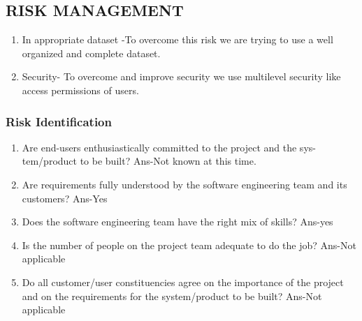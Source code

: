 \documentclass[12pt]{report}
\begin{document}
\subsection{RISK MANAGEMENT}
\justifying
\setlength{\parindent}{4em}
\setlength{\parskip}{0.5em}
\renewcommand{\baselinestretch}{1.5}
\vspace{0.1cm}
\begin{enumerate}
\item In appropriate dataset -To overcome this risk we are trying to use a well organized and complete dataset.
\item Security- To overcome and improve security we use multilevel security like access permissions of users.

\end{enumerate}
\subsubsection{Risk Identification}
\justifying
\setlength{\parindent}{4em}
\setlength{\parskip}{0.5em}
\renewcommand{\baselinestretch}{1.5}
\vspace{0.1cm}
\begin{enumerate}
\item Are end-users enthusiastically committed to the project and the sys- tem/product to be built?
Ans-Not known at this time.
\item Are requirements fully understood by the software engineering team and its customers?
Ans-Yes
\item Does the software engineering team have the right mix of skills? Ans-yes
\item Is the number of people on the project team adequate to do the job? Ans-Not applicable
\item Do all customer/user constituencies agree on the importance of the project and on the requirements for the system/product to be built?
Ans-Not applicable
\end{enumerate}
\end{document}
